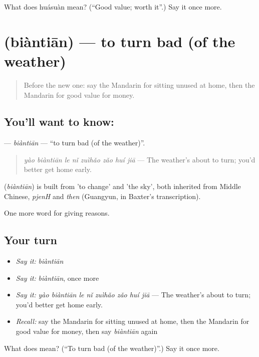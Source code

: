 \begin{tcolorbox}[breakable,colback=teal!4,colframe=teal!35!black,title={Before you move on}]
What does huásuàn mean? (\textquotedblleft{}Good value; worth it\textquotedblright{}.) Say it once more.
\end{tcolorbox}
\section[\texorpdfstring{\zh{变天} (biàntiān)}{变天 (biàntiān)}]{ (biàntiān) — to turn bad (of the weather)}

\label{lesson:ZH-C386-biantian}



\begin{quote}
Before the new one: say the Mandarin for sitting unused at home, then the Mandarin for good value for money.
\end{quote}

\subsection*{You'll want to know: }
\textbf{} — \emph{biàntiān} — \textquotedblleft{}to turn bad (of the weather)\textquotedblright{}.

\begin{quote}
\textbf{} \emph{yào biàntiān le nǐ zuìhǎo zǎo huí jiā} — The weather's about to turn; you'd better get home early.
\end{quote}

\begin{cousinweb}
\textbf{} (\emph{biàntiān}) is built from  'to change' and  'the sky', both inherited from Middle Chinese, \emph{pjenH} and \emph{then} (Guangyun, in Baxter's transcription).
\end{cousinweb}

\begin{grammarlens}[title={What you've built}]
One more word for giving reasons.
\end{grammarlens}

\subsection*{Your turn}
\begin{itemize}
\raggedright
  \item \emph{Say it:} \emph{biàntiān}
  \item \emph{Say it:} \emph{biàntiān}, once more
  \item \emph{Say it:} \emph{yào biàntiān le nǐ zuìhǎo zǎo huí jiā} — The weather's about to turn; you'd better get home early.
  \item \emph{Recall:} say the Mandarin for sitting unused at home, then the Mandarin for good value for money, then say \emph{biàntiān} again
\end{itemize}

\begin{tcolorbox}[breakable,colback=teal!4,colframe=teal!35!black,title={Before you move on}]
What does  mean? (\textquotedblleft{}To turn bad (of the weather)\textquotedblright{}.) Say it once more.
\end{tcolorbox}
